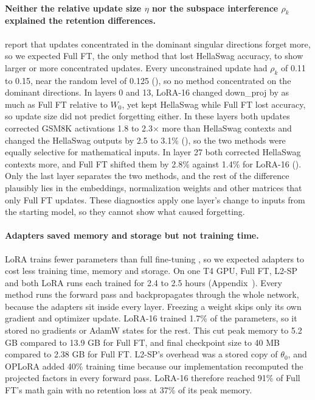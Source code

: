 \documentclass{article}
\newcommand{\tablebody}[1]{\small\setlength{\tabcolsep}{4pt}}
\begin{document}
\paragraph{Neither the relative update size $\eta$ nor the subspace interference $\rho_k$ explained the retention differences.}
\citet{oplora} report that updates concentrated in the dominant singular directions forget more, so we expected Full FT, the only method that lost HellaSwag accuracy, to show larger or more concentrated updates. Every unconstrained update had $\rho_k$ of 0.11 to 0.15, near the random level of 0.125 (), so no method concentrated on the dominant directions. In layers 0 and 13, LoRA-16 changed down\_proj by as much as Full FT relative to $W_0$, yet kept HellaSwag while Full FT lost accuracy, so update size did not predict forgetting either. In these layers both updates corrected GSM8K activations 1.8 to 2.3$\times$ more than HellaSwag contexts and changed the HellaSwag outputs by 2.5 to 3.1\% (), so the two methods were equally selective for mathematical inputs. In layer 27 both corrected HellaSwag contexts more, and Full FT shifted them by 2.8\% against 1.4\% for LoRA-16 (). Only the last layer separates the two methods, and the rest of the difference plausibly lies in the embeddings, normalization weights and other matrices that only Full FT updates. These diagnostics apply one layer's change to inputs from the starting model, so they cannot show what caused forgetting.

\begin{table}[t]
  \centering
  \caption{Weight and activation diagnostics for down\_proj, listed as layer 0 / 13 / 27. $R$ is the mean activation correction over 32 GSM8K (math) and 32 HellaSwag (non-math) probe prompts.}
  \label{tab:t1diag}
  \tablebody{tables/t1_diagnostics.tex}
\end{table}

\paragraph{Adapters saved memory and storage but not training time.}
LoRA trains fewer parameters than full fine-tuning \citep{lora}, so we expected adapters to cost less training time, memory and storage. On one T4 GPU, Full FT, L2-SP and both LoRA runs each trained for 2.4 to 2.5 hours (Appendix~). Every method runs the forward pass and backpropagates through the whole network, because the adapters sit inside every layer. Freezing a weight skips only its own gradient and optimizer update. LoRA-16 trained 1.7\% of the parameters, so it stored no gradients or AdamW states for the rest. This cut peak memory to 5.2 GB compared to 13.9 GB for Full FT, and final checkpoint size to 40 MB compared to 2.38 GB for Full FT. L2-SP's overhead was a stored copy of $\theta_0$, and OPLoRA added 40\% training time because our implementation recomputed the projected factors in every forward pass. LoRA-16 therefore reached 91\% of Full FT's math gain with no retention loss at 37\% of its peak memory.
\end{document}
